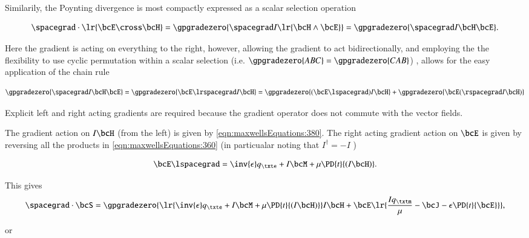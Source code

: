 Similarily, the Poynting divergence is most compactly expressed as a scalar selection operation

\begin{equation}\label{eqn:maxwellsEquations:640}
\spacegrad \cdot \lr{ \bcE \cross \bcH }
=
\gpgradezero{ \spacegrad I \lr{ \bcH \wedge \bcE } }
=
\gpgradezero{ \spacegrad I \bcH \bcE }.
\end{equation}

Here the gradient is acting on everything to the right, however, allowing the gradient to act bidirectionally, and employing the
the flexibility to use cyclic permutation within a scalar selection
(i.e. \(\gpgradezero{ABC} = \gpgradezero{CAB}\))
, allows for the easy application of the chain rule

\begin{dmath}\label{eqn:maxwellsEquations:760}
\gpgradezero{ \spacegrad I \bcH \bcE }
=
\gpgradezero{ \bcE \lrspacegrad I \bcH }
=
\gpgradezero{ (\bcE \lspacegrad) I \bcH }
+\gpgradezero{ \bcE (\rspacegrad I \bcH) }
\end{dmath}

Explicit left and right acting gradients are required because the gradient operator does not commute with the vector fields.

The gradient action on \( I \bcH \) (from the left) is given by 
\cref{eqn:maxwellsEquations:380}.  The right acting gradient action on \( \bcE \) is given by reversing all the products in
\cref{eqn:maxwellsEquations:360} (in particualar noting that \( I^\dagger = -I \) )

\begin{dmath}\label{eqn:maxwellsEquations:660}
\bcE \lspacegrad = \inv{\epsilon} q_\txte + I \bcM + \mu \PD{t}{(I\bcH)}.
\end{dmath}

This gives
\begin{dmath}\label{eqn:maxwellsEquations:680}
\spacegrad \cdot \bcS
=
\gpgradezero
{
\lr{ \inv{\epsilon} q_\txte + I \bcM + \mu \PD{t}{(I\bcH)} } I \bcH
+
\bcE 
\lr
{
\frac{I q_\txtm}{\mu} - \bcJ - \epsilon \PD{t}{\bcE}
}
}
,
\end{dmath}

or

